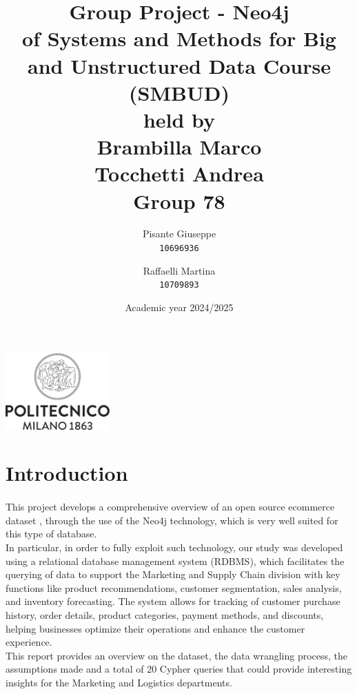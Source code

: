 \documentclass[a4paper,12pt]{article}
\begin{document}
\title{%
  Group Project - Neo4j \\
  \large of Systems and Methods for Big
    and Unstructured Data Course \\(SMBUD)\\
    held by\\ Brambilla Marco\\ Tocchetti Andrea \\
  \vspace{5mm}
  \Large \textbf{Group 78}}
\author{Pisante Giuseppe\\
  \texttt{10696936}
  \and
  Raffaelli Martina\\
  \texttt{10709893}
}
\date{Academic year 2024/2025}
\maketitle
\begin{center}
  \includegraphics[width=4cm]{polilogo.png}\\
\end{center}
\newpage
\tableofcontents
\newpage
\section{Introduction}
\paragraph{} This project develops a comprehensive overview of an open source ecommerce dataset \cite{kaggle_dataset}, through the use of the Neo4j technology, which is very well suited for this type of database.
\\
In particular, in order to fully exploit such technology, our study was developed using a relational database management system (RDBMS), which facilitates the querying of data to support the Marketing and Supply Chain division with key functions like product recommendations, customer segmentation, sales analysis, and inventory forecasting. 
The system allows for tracking of customer purchase history, order details, product categories, payment methods, and discounts, helping businesses optimize their operations and enhance the customer experience.
\\
This report provides an overview on the dataset, the data wrangling process, the assumptions made and a total of 20 Cypher queries that could provide interesting insights for the Marketing and Logistics departments.
\newpage
\end{document}
